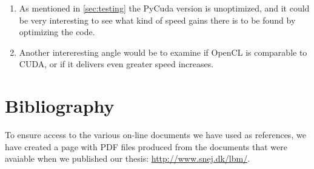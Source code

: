 \begin{enumerate}
\item As mentioned in \autoref{sec:testing} the PyCuda version is unoptimized, and it could be very interesting to see what kind of speed gains there is to be found by optimizing the code.
\item Another intereresting angle would be to examine if OpenCL is comparable to CUDA, or if it delivers even greater speed increases.
\end{enumerate}

\newpage


\newpage
\section{Bibliography}

To ensure access to the various on-line documents we have used as references, we have created a page with PDF files produced from the documents that were avaiable when we published our thesis: \url{http://www.snej.dk/lbm/}.






